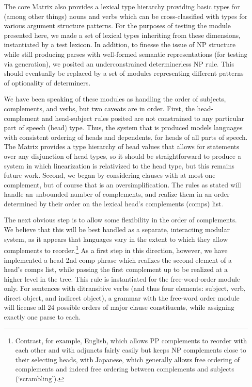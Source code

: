 The core Matrix also provides a lexical type hierarchy providing basic
types for (among other things) nouns and verbs which can be
cross-classified with types for various argument structure patterns.
For the purposes of testing the module presented here, we made a set
of lexical types inheriting from these dimensions, instantiated by a
test lexicon.  In addition, to finesse the issue of NP structure while
still producing parses with well-formed semantic representations (for
testing via generation), we posited an underconstrained determinerless
NP rule.  This should eventually be replaced by a set of modules
representing different patterns of optionality of determiners.

We have been speaking of these modules as handling the order of
subjects, complements, and verbs, but two caveats are in order.  First,
the head-complement and head-subject rules posited are not constrained
to any particular part of speech (head) type. Thus, the system that is
produced models languages with consistent ordering of heads and
dependents, for heads of all parts of speech.  The Matrix provides a
type hierarchy of {\sc head} values that allows for statements over any
disjunction of head types, so it should be straightforward to produce
a system in which linearization is relativized to the head type, but
this remains future work.  Second, we began by considering clauses
with at most one complement, but of course that is an
oversimplification.  The rules as stated will handle an unbounded
number of complements, and realize them in an order determined by
their order on the lexical head's complements ({\sc comps}) list.

The next obvious step is to allow some flexibility in the order of
complements.  We believe that this will be best handled as a separate,
interacting modular system, as it appears that languages vary in the
extent to which they allow complements to reorder.\footnote{Contrast,
for example, English, which allows PP complements to reorder with each
other and with adjuncts fairly easily but keeps NP complements close
to their selecting heads, with Japanese, which generally allows free
ordering of complements and indeed free ordering between complements
and subjects (`scrambling').}  As a first step in this direction,
however, we have implemented a head-2nd-comp-phrase which realizes the
second element of a head's {\sc comps} list, while passing the first
complement up to be realized at a higher level in the tree.  This rule
is instantiated for the free-word-order module only.  For sentences
with ditransitive verbs (and thus four elements: subject, verb, direct
object, and indirect object), a grammar with the free-word order
module will license all 24 possible orders of major clause
constituents, while assigning exactly one parse to each.

